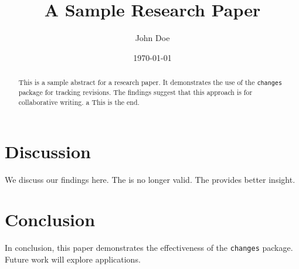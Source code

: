 \documentclass[12pt]{article}
\title{A Sample Research Paper}
\author{John Doe}
\date{\today}
\begin{document}
\maketitle

\begin{abstract}
This is a sample abstract for a research paper. It demonstrates the use of the \texttt{changes} package for tracking revisions. The  findings suggest that this approach is  for collaborative writing.
{a}
This is the end.
\end{abstract}







\section{Discussion}
\label{sec:discussion}

We discuss our findings here. The  is no longer valid. The  provides better insight.

\section{Conclusion}
\label{sec:conclusion}

In conclusion, this paper demonstrates the effectiveness of the \texttt{changes} package. Future work will explore  applications.



\end{document}
